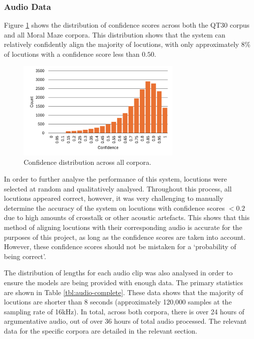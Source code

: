 \documentclass[twocolumn,twoside]{article}
\begin{document}
\subsubsection{Audio Data}\label{sec:datasets-audio}

Figure \ref{fig:complete-confidence} shows the distribution of
confidence scores across both the QT30 corpus and all Moral Maze
corpora. This distribution shows that the system can relatively
confidently align the majority of locutions, with only approximately 8\%
of locutions with a confidence score less than \(0.50\).

\begin{figure}[h!]
\centering
\includegraphics[width=8cm]{complete-confidence}
\caption{Confidence distribution across all corpora. \label{fig:complete-confidence}}
\end{figure}

In order to further analyse the performance of this system, locutions
were selected at random and qualitatively analysed. Throughout this
process, all locutions appeared correct, however, it was very
challenging to manually determine the accuracy of the system on
locutions with confidence scores \(<0.2\) due to high amounts of
crosstalk or other acoustic artefacts. This shows that this method of
aligning locutions with their corresponding audio is accurate for the
purposes of this project, as long as the confidence scores are taken
into account. However, these confidence scores should not be mistaken
for a `probability of being correct'.

The distribution of lengths for each audio clip was also analysed in
order to ensure the models are being provided with enough data. The
primary statistics are shown in Table \ref{tbl:audio-complete}. These
data shows that the majority of locutions are shorter than 8 seconds
(approximately 120,000 samples at the sampling rate of 16kHz). In total,
across both corpora, there is over 24 hours of argumentative audio, out
of over 36 hours of total audio processed. The relevant data for the
specific corpora are detailed in the relevant section.
\end{document}
